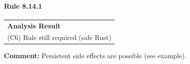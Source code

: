 \paragraph{Rule 8.14.1}
\begin{longtable}{p{13cm}}
\textbf{Analysis Result} \\
(C6) Rule still required (safe Rust) \\
\end{longtable}
\textbf{Comment:} Persistent side effects are possible (see example). \\


